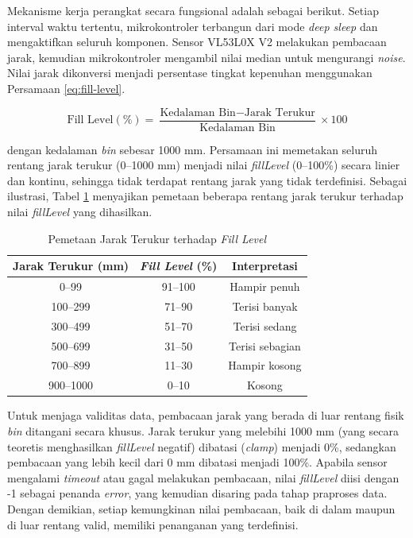 Mekanisme kerja perangkat secara fungsional adalah sebagai berikut. Setiap interval waktu tertentu, mikrokontroler terbangun dari mode \textit{deep sleep} dan mengaktifkan seluruh komponen. Sensor VL53L0X V2 melakukan pembacaan jarak, kemudian mikrokontroler mengambil nilai median untuk mengurangi \textit{noise}. Nilai jarak dikonversi menjadi persentase tingkat kepenuhan menggunakan Persamaan \ref{eq:fill-level}.

\begin{equation}
  \text{Fill Level} (\%) = \frac{\text{Kedalaman Bin} - \text{Jarak Terukur}}{\text{Kedalaman Bin}} \times 100
  \label{eq:fill-level}
\end{equation}

dengan kedalaman \textit{bin} sebesar 1000 mm. Persamaan ini memetakan seluruh rentang jarak terukur (0--1000 mm) menjadi nilai \textit{fillLevel} (0--100\%) secara linier dan kontinu, sehingga tidak terdapat rentang jarak yang tidak terdefinisi. Sebagai ilustrasi, Tabel \ref{tab:konversi-filllevel} menyajikan pemetaan beberapa rentang jarak terukur terhadap nilai \textit{fillLevel} yang dihasilkan.

\begin{table}[H]
  \caption{Pemetaan Jarak Terukur terhadap \textit{Fill Level}}
  \label{tab:konversi-filllevel}
  \centering
  \begin{tabular}{| c | c | c |}
    \hline
    \textbf{Jarak Terukur (mm)} & \textbf{\textit{Fill Level} (\%)} & \textbf{Interpretasi} \\
    \hline
    0--99 & 91--100 & Hampir penuh \\
    \hline
    100--299 & 71--90 & Terisi banyak \\
    \hline
    300--499 & 51--70 & Terisi sedang \\
    \hline
    500--699 & 31--50 & Terisi sebagian \\
    \hline
    700--899 & 11--30 & Hampir kosong \\
    \hline
    900--1000 & 0--10 & Kosong \\
    \hline
  \end{tabular}
\end{table}

Untuk menjaga validitas data, pembacaan jarak yang berada di luar rentang fisik \textit{bin} ditangani secara khusus. Jarak terukur yang melebihi 1000 mm (yang secara teoretis menghasilkan \textit{fillLevel} negatif) dibatasi (\textit{clamp}) menjadi 0\%, sedangkan pembacaan yang lebih kecil dari 0 mm dibatasi menjadi 100\%. Apabila sensor mengalami \textit{timeout} atau gagal melakukan pembacaan, nilai \textit{fillLevel} diisi dengan -1 sebagai penanda \textit{error}, yang kemudian disaring pada tahap praproses data. Dengan demikian, setiap kemungkinan nilai pembacaan, baik di dalam maupun di luar rentang valid, memiliki penanganan yang terdefinisi.

